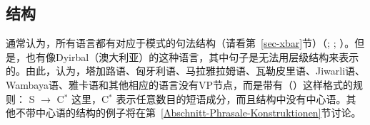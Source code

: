 
\subsection{\xbar 结构}
\label{sec-Diskussion-X-Bar}

通常认为，所有语言都有对应于\xbar 模式的句法结构（请看第~\ref{sec-xbar}节）（\citealp[]{Pinker94a}; \citealp[, 14]{Meisel95a}; \citealp[]{PJ2005a}）。但是，也有像Dyirbal（澳大利亚）的这种语言，其中句子是无法用层级结构来表示的。由此，\citet[]{Bresnan2001a}认为，塔加路语、匈牙利语、马拉雅拉姆语、瓦勒皮里语、Jiwarli语、Wambaya语、雅卡语和其他相应的语言没有VP节点，而是带有（）这样格式的规则：
\ea
S $\to$ C$^*$
\z
这里，C$^*$ 表示任意数目的短语成分，而且结构中没有中心语。其他不带中心语的结构的例子将在第~\ref{Abschnitt-Phrasale-Konstruktionen}节讨论。


